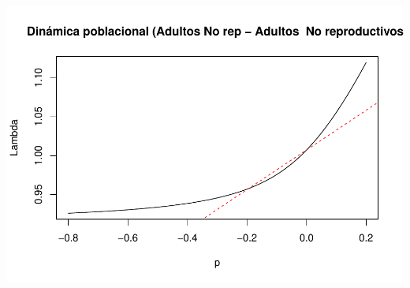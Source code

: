 \documentclass[
]{book}
\theoremstyle{definition}
\theoremstyle{definition}
\theoremstyle{definition}
\theoremstyle{definition}
\theoremstyle{remark}
\begin{document}
\includegraphics{Diagnostico_Poblacional_files/figure-latex/chap10_6-6.pdf}
\end{document}
